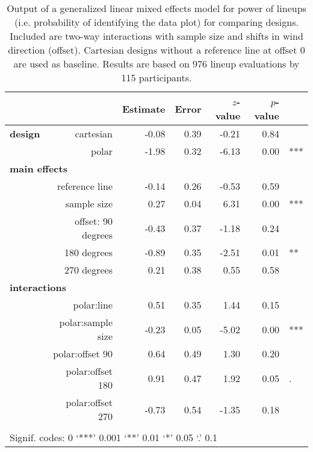 \begin{table}[ht]
\begin{center}
\resizebox{\linewidth}{!} {
\begin{tabular}{rrrrrrl}
  \hline
& & Estimate & Error & $z$-value & $p$-value &\\ 
  \hline
\bf design & cartesian & -0.08 & 0.39 & -0.21 & 0.84 &\\ 
&polar & -1.98 & 0.32 & -6.13 & 0.00 & ***\\ [3pt]
\multicolumn{2}{l}{\bf main effects} &&&&&\\
& reference line  & -0.14 & 0.26 & -0.53 & 0.59 & \\ [1pt]
&  sample size & 0.27 & 0.04 & 6.31 & 0.00 & ***\\[1pt]
 &offset:  90 degrees& -0.43 & 0.37 & -1.18 & 0.24 &\\ 
  & 180 degrees& -0.89 & 0.35 & -2.51 & 0.01 & **\\ 
  & 270 degrees& 0.21 & 0.38 & 0.55 & 0.58 &\\ [3pt]
\multicolumn{2}{l}{\bf interactions} &&&&&\\
&  polar:line & 0.51 & 0.35 & 1.44 & 0.15 &\\ [1pt]
&    polar:sample size & -0.23 & 0.05 & -5.02 & 0.00 & ***\\[1pt]
&    polar:offset 90 & 0.64 & 0.49 & 1.30 & 0.20 \\ 
&  polar:offset 180 & 0.91 & 0.47 & 1.92 & 0.05 & .\\ 
&    polar:offset 270 & -0.73 & 0.54 & -1.35 & 0.18 &\\
   \hline
\\[-5pt]
   \multicolumn{5}{l}{Signif. codes:  0 `***' 0.001 `**' 0.01 `*' 0.05 `.' 0.1}
\end{tabular}
}
\end{center}
\vspace{-0.2in}
\caption{\label{tbl:correct} Output of a generalized linear mixed effects model for power of lineups (i.e. probability of identifying the data plot) for comparing designs. Included are two-way interactions with sample size and shifts in wind direction (offset). Cartesian designs without a reference line at offset 0 are used as baseline.
 Results are based on  976 lineup evaluations by 115 participants. }
\end{table}



